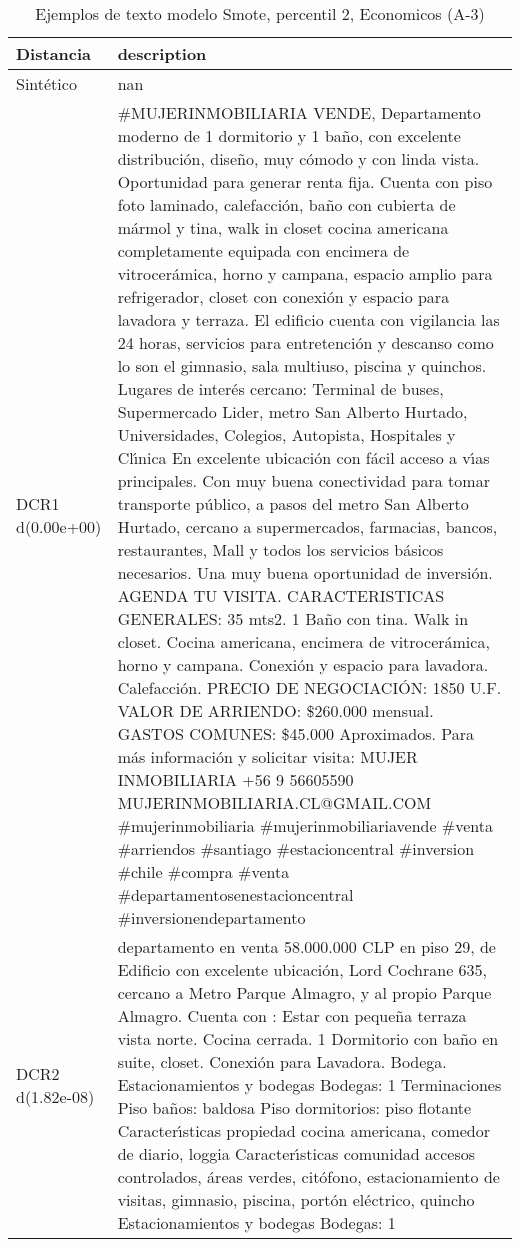 \begin{table}[H]
\centering
\fontsize{10}{14}\selectfont
\caption{Ejemplos de texto modelo Smote, percentil 2, Economicos (A-3)}
\label{table-example-economicos-a-3-smote-enc-2p-text}
\begin{tabular}{|l|m{35em}|}
\hline
\rowcolor[gray]{0.8}
Distancia & description \\
\hline Sintético & nan \\
\hline DCR1 d(0.00e+00) & \#MUJERINMOBILIARIA VENDE, Departamento moderno de 1 dormitorio y 1 ba\~no, con excelente distribuci\'on, dise\~no, muy c\'omodo y con linda vista. Oportunidad para generar renta fija.  Cuenta con piso foto laminado, calefacci\'on, ba\~no con cubierta de m\'armol y tina, walk in closet cocina americana completamente equipada con encimera de vitrocer\'amica, horno y campana, espacio amplio para refrigerador, closet con conexi\'on y espacio para lavadora y terraza.  El edificio cuenta con vigilancia las 24 horas, servicios para entretenci\'on y descanso como lo son el gimnasio, sala multiuso, piscina y quinchos.  Lugares de inter\'es cercano: Terminal de buses, Supermercado Lider, metro San Alberto Hurtado, Universidades, Colegios, Autopista, Hospitales y Cl{\'\i}nica  En excelente ubicaci\'on con f\'acil acceso a v{\'\i}as principales. Con muy buena conectividad para tomar transporte p\'ublico, a pasos del metro San Alberto Hurtado, cercano a supermercados, farmacias, bancos, restaurantes, Mall y todos los servicios b\'asicos necesarios.  Una muy buena oportunidad de inversi\'on. AGENDA TU VISITA.  CARACTERISTICAS GENERALES: 35 mts2. 1 Ba\~no con tina. Walk in closet. Cocina americana, encimera de vitrocer\'amica, horno y campana. Conexi\'on y espacio para lavadora. Calefacci\'on.  PRECIO DE NEGOCIACI\'ON: 1850 U.F. VALOR DE ARRIENDO: \$260.000 mensual. GASTOS COMUNES: \$45.000 Aproximados.  Para m\'as informaci\'on y solicitar visita: MUJER INMOBILIARIA +56 9 56605590  MUJERINMOBILIARIA.CL@GMAIL.COM  \#mujerinmobiliaria \#mujerinmobiliariavende \#venta \#arriendos \#santiago \#estacioncentral \#inversion \#chile \#compra \#venta \#departamentosenestacioncentral \#inversionendepartamento \\
\hline DCR2 d(1.82e-08) & departamento en venta 58.000.000 CLP en piso 29, de Edificio con excelente ubicaci\'on, Lord Cochrane 635, cercano a Metro Parque Almagro, y al propio Parque Almagro. Cuenta con : Estar con peque\~na terraza vista norte. Cocina cerrada. 1 Dormitorio con ba\~no en suite, closet. Conexi\'on para Lavadora. Bodega.  Estacionamientos y bodegas Bodegas: 1    Terminaciones  Piso ba\~nos: baldosa Piso dormitorios: piso flotante  Caracter{\'\i}sticas propiedad  cocina americana, comedor de diario, loggia  Caracter{\'\i}sticas comunidad  accesos controlados, \'areas verdes, cit\'ofono, estacionamiento de visitas, gimnasio, piscina, port\'on el\'ectrico, quincho  Estacionamientos y bodegas   Bodegas: 1 \\
\hline
\end{tabular}
\end{table}
